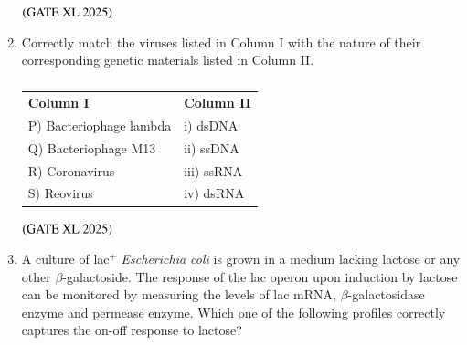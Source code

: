 \documentclass[journal]{IEEEtran}
\begin{document}
\begin{enumerate}
    \hfill $\left(\text{GATE XL 2025}\right)$

    \begin{enumerate}
    \end{enumerate}

    \item Correctly match the viruses listed in Column I with the nature of their corresponding genetic materials listed in Column II.

    \begin{table}[H]
        \centering
        \begin{tabular}{ll}
            \textbf{Column I} & \textbf{Column II} \\
            P) Bacteriophage lambda & i) dsDNA \\
            Q) Bacteriophage M13    & ii) ssDNA \\
            R) Coronavirus          & iii) ssRNA \\
            S) Reovirus             & iv) dsRNA \\
        \end{tabular}
        \caption*{}
        \label{tab:xl2025_q76}
    \end{table}

    \hfill $\left(\text{GATE XL 2025}\right)$

    \begin{enumerate}
    \end{enumerate}

    \item A culture of lac$^+$ \textit{Escherichia coli} is grown in a medium lacking lactose or any other $\beta$-galactoside. The response of the lac operon upon induction by lactose can be monitored by measuring the levels of lac mRNA, $\beta$-galactosidase enzyme and permease enzyme. Which one of the following profiles correctly captures the on-off response to lactose?


\end{enumerate}
\end{document}
